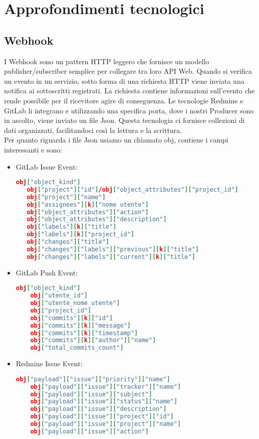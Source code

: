 \newpage
\section{Approfondimenti tecnologici}
	
	\subsection{Webhook}
		I Webhook sono un pattern HTTP leggero che fornisce un modello publisher/subscriber semplice
		per collegare tra loro API Web.	
		Quando si verifica un evento in un servizio, sotto forma di una richiesta HTTP viene inviata una
		notifica ai sottoscritti registrati. La richiesta contiene informazioni sull'evento che rende
		possibile per il ricevitore agire di conseguenza.
		Le tecnologie Redmine e GitLab li integrano e utilizzando una specifica porta, dove i nostri
		Producer sono in ascolto, viene inviato un file Json. Questa tecnologia ci fornisce
		collezioni di dati organizzati, facilitandoci così la lettura e la scrittura.\\
        Per quanto riguarda i file Json usiamo un  chiamato obj, contiene i campi interessanti e sono:
            \begin{itemize}
                \item GitLab Issue Event:
\begin{lstlisting}[language = json]
   obj["object_kind"]
   obj["project"]["id"]/obj["object_attributes"]["project_id"]
   obj["project"]["name"]
   obj["assignees"][k]["nome utente"]
   obj["object_attributes"]["action"]
   obj["object_attributes"]["description"]
   obj["labels"][k]["title"]
   obj["labels"][k]["project_id"]
   obj["changes"]["title"]
   obj["changes"]["labels"]["previous"][k]["title"]
   obj["changes"]["labels"]["current"][k]["title"]
\end{lstlisting}
                \item GitLab Push Event:
\begin{lstlisting}[language = json]
    obj["object_kind"]
    obj["utente_id"]
    obj["utente_nome utente"]
    obj["project_id"]
    obj["commits"][k]["id"]
    obj["commits"][k]["message"]
    obj["commits"][k]["timestamp"]
    obj["commits"][k]["author"]["name"]
    obj["total_commits_count"]
\end{lstlisting}
                \item Redmine Issue Event:
\begin{lstlisting}[language = json]
    obj["payload"]["issue"]["priority"]["name"]
    obj["payload"]["issue"]["tracker"]["name"]
    obj["payload"]["issue"]["subject"]
    obj["payload"]["issue"]["status"]["name"]
    obj["payload"]["issue"]["description"]
    obj["payload"]["issue"]["project"]["id"]
    obj["payload"]["issue"]["project"]["name"]
    obj["payload"]["issue"]["action"]
\end{lstlisting}
            \end{itemize}
	
